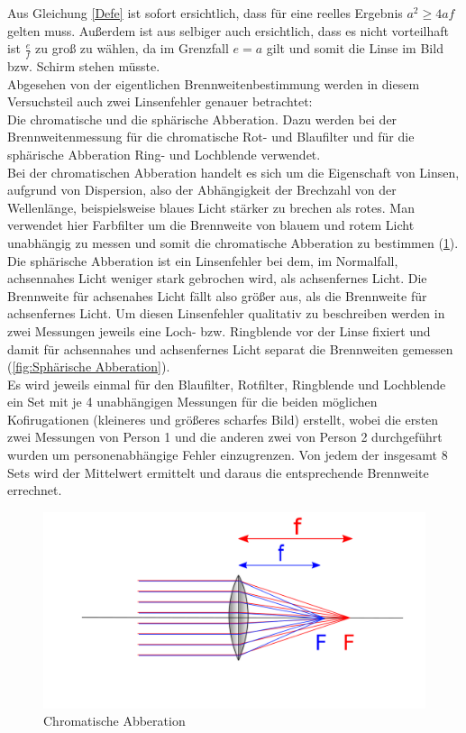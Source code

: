 Aus Gleichung \ref{Defe} ist sofort ersichtlich, dass für eine reelles Ergebnis $a^2 \geq 4af$ gelten muss. Außerdem ist aus selbiger auch ersichtlich, dass es nicht vorteilhaft ist $\frac{e}{f}$ zu groß zu wählen, da im Grenzfall $e = a$ gilt und somit die Linse im Bild bzw. Schirm stehen müsste. \\
Abgesehen von der eigentlichen Brennweitenbestimmung werden in diesem Versuchsteil auch zwei Linsenfehler genauer betrachtet:\\
Die chromatische und die sphärische Abberation. Dazu werden bei der Brennweitenmessung für die chromatische Rot- und Blaufilter und für die sphärische Abberation Ring- und Lochblende verwendet.\\
Bei der chromatischen Abberation handelt es sich um die Eigenschaft von Linsen, aufgrund von Dispersion, also der Abhängigkeit der Brechzahl von der Wellenlänge, beispielsweise blaues Licht stärker zu brechen als rotes. Man verwendet hier Farbfilter um die Brennweite von blauem und rotem Licht unabhängig zu messen und somit die chromatische Abberation zu bestimmen (\ref{fig:Chromatische Abberation}).\\
Die sphärische Abberation ist ein Linsenfehler bei dem, im Normalfall, achsennahes Licht weniger stark gebrochen wird, als achsenfernes Licht. Die Brennweite für achsenahes Licht fällt also größer aus, als die Brennweite für achsenfernes Licht. Um diesen Linsenfehler qualitativ zu beschreiben werden in zwei Messungen jeweils eine Loch- bzw. Ringblende vor der Linse fixiert und damit für achsennahes und achsenfernes Licht separat die Brennweiten gemessen (\ref{fig:Sphärische Abberation}).\\
Es wird jeweils einmal für den Blaufilter, Rotfilter, Ringblende und Lochblende ein Set mit je 4 unabhängigen Messungen für die beiden möglichen Kofirugationen (kleineres und größeres scharfes Bild) erstellt, wobei die ersten zwei Messungen von Person 1 und die anderen zwei von Person 2 durchgeführt wurden um personenabhängige Fehler einzugrenzen. Von jedem der insgesamt 8 Sets wird der Mittelwert ermittelt und daraus die entsprechende Brennweite errechnet.

\begin{figure}[h!]
    \centering
    \includegraphics[scale=0.8]{Geometrische_Optik/Protokoll/fig/Chromatische Abberation.png}
    \caption{Chromatische Abberation}
    \label{fig:Chromatische Abberation}
\end{figure}

